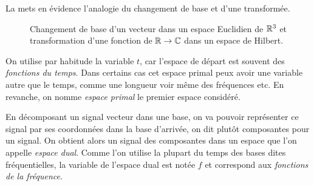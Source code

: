 
La  mets en évidence l'analogie du changement de
base et d'une transformée.

\begin{figure}[ht]
  \centering
  \caption{Changement de base d'un vecteur dans un espace Euclidien de
    $\mathbb{R}^3$ et transformation d'une fonction de $\mathbb{R}\rightarrow\mathbb{C}$ dans
    un espace de Hilbert.}
  \label{fig:espaces}
\end{figure}

On utilise par habitude la variable $t$, car l'espace de départ est
souvent des \emph{fonctions du temps}. Dans certains cas cet espace
primal peux avoir une variable autre que le temps, comme une longueur
voir même des fréquences etc. En revanche, on nomme \emph{espace
  primal} le premier espace considéré.

En décomposant un signal vecteur dans une base, on va pouvoir
représenter ce signal par ses coordonnées dans la base d'arrivée, on
dit plutôt composantes pour un signal. On obtient alors un \og{}signal
des composantes\fg{} dans un espace que l'on appelle \emph{espace
  dual}. Comme l'on utilise la plupart du temps des bases dites
fréquentielles, la variable de l'espace dual est notée $f$ et
correspond aux \emph{fonctions de la fréquence}.

